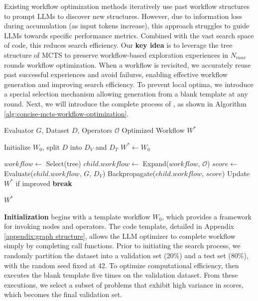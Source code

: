 Existing workflow optimization methods iteratively use past workflow structures to prompt LLMs to discover new structures. However, due to information loss during accumulation (as input tokens increase), this approach struggles to guide LLMs towards specific performance metrics. Combined with the vast search space of code, this reduces search efficiency.
Our \textbf{key idea} is to leverage the tree structure of MCTS to preserve workflow-based exploration experiences in $N_{max}$ rounds workflow optimization. When a workflow is revisited, we accurately reuse past successful experiences and avoid failures, enabling effective workflow generation and improving search efficiency. To prevent local optima, we introduce a special selection mechanism allowing generation from a blank template at any round.
Next, we will introduce the complete process of \model, as shown in Algorithm \ref{alg:concise-mcts-workflow-optimization}.


\begin{algorithm}[!t]
\caption{Algorithm of \model: Detailed implementation}
\label{alg:concise-mcts-workflow-optimization}
\begin{algorithmic}[1]
\Require Evaluator $G$, Dataset $D$, Operators $\mathcal{O}$
\Ensure Optimized Workflow $W^*$

\State Initialize $W_0$, split $D$ into $D_V$ and $D_T$
\State $W^* \gets W_0$

    \State $workflow \gets$ Select(tree) 
    \State $child.workflow \gets$ Expand($workflow$, $\mathcal{O}$) 
    \State $score \gets$ Evaluate($child.workflow$, $G$, $D_V$) 
    \State Backpropagate($child.workflow$, $score$) 
    \State Update $W^*$ if improved
        \textbf{break}
    \EndIf
\EndFor

\State \Return $W^*$
\end{algorithmic}
\end{algorithm}

\textbf{Initialization}
\model begins with a template workflow $W_0$, which provides a framework for invoking nodes and operators. The code template, detailed in Appendix \ref{appendix:graph structure}, allows the LLM optimizer to complete workflow simply by completing call functions. Prior to initiating the search process, we randomly partition the dataset into a validation set (20\%) and a test set (80\%), with the random seed fixed at 42. To optimize computational efficiency, \model then executes the blank template five times on the validation dataset. From these executions, we select a subset of problems that exhibit high variance in scores, which becomes the final validation set.

